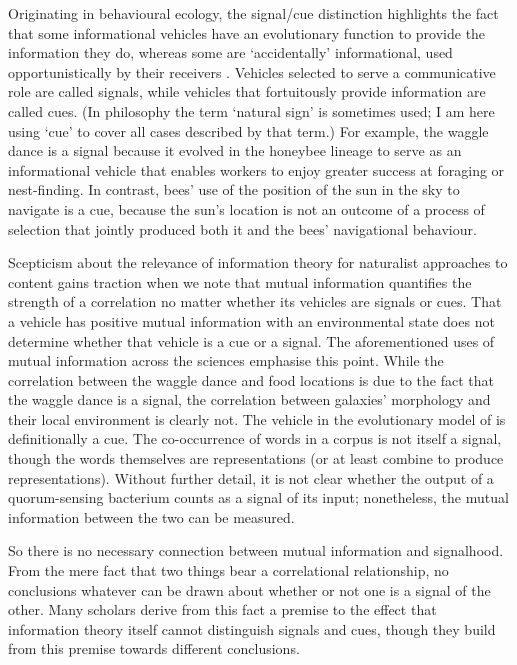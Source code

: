 Originating in behavioural ecology, the signal/cue distinction highlights the fact that some informational vehicles have an evolutionary function to provide the information they do, whereas some are `accidentally' informational, used opportunistically by their receivers \citep[$\S$1.2]{maynardsmith2003animal}.
Vehicles selected to serve a communicative role are called signals, while vehicles that fortuitously provide information are called cues.
(In philosophy the term `natural sign' is sometimes used; I am here using `cue' to cover all cases described by that term.)
For example, the waggle dance is a signal because it evolved in the honeybee lineage to serve as an informational vehicle that enables workers to enjoy greater success at foraging or nest-finding.
In contrast, bees' use of the position of the sun in the sky to navigate is a cue, because the sun's location is not an outcome of a process of selection that jointly produced both it and the bees' navigational behaviour.

Scepticism about the relevance of information theory for naturalist approaches to content gains traction when we note that mutual information quantifies the strength of a correlation no matter whether its vehicles are signals or cues.
That a vehicle has positive mutual information with an environmental state does not determine whether that vehicle is a cue or a signal.
The aforementioned uses of mutual information across the sciences emphasise this point.
While the correlation between the waggle dance and food locations is due to the fact that the waggle dance is a signal, the correlation between galaxies' morphology and their local environment is clearly not.
The vehicle in the evolutionary model of \citet{donaldson-matasci2010fitness} is definitionally a cue.
The co-occurrence of words in a corpus is not itself a signal, though the words themselves are representations (or at least combine to produce representations).
Without further detail, it is not clear whether the output of a quorum-sensing bacterium counts as a signal of its input; nonetheless, the mutual information between the two can be measured.

So there is no necessary connection between mutual information and signalhood.
From the mere fact that two things bear a correlational relationship, no conclusions whatever can be drawn about whether or not one is a signal of the other.
Many scholars derive from this fact a premise to the effect that information theory itself cannot distinguish signals and cues, though they build from this premise towards different conclusions.

